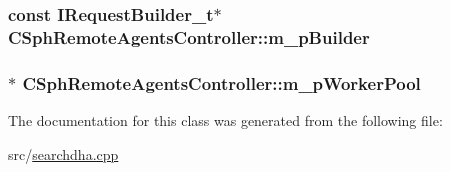 \hypertarget{classCSphRemoteAgentsController_a47d889a791191212a3a8d559aa69accf}{
\subsubsection[{m\-\_\-p\-Builder}]{\setlength{\rightskip}{0pt plus 5cm}const {\bf I\-Request\-Builder\-\_\-t}$\ast$ C\-Sph\-Remote\-Agents\-Controller\-::m\-\_\-p\-Builder\hspace{0.3cm}{\ttfamily [private]}}}\label{classCSphRemoteAgentsController_a47d889a791191212a3a8d559aa69accf}
\hypertarget{classCSphRemoteAgentsController_a1761bc177b4e266d5d4dfef5bcf77946}{
\subsubsection[{m\-\_\-p\-Worker\-Pool}]{$\ast$ C\-Sph\-Remote\-Agents\-Controller\-::m\-\_\-p\-Worker\-Pool\hspace{0.3cm}{\ttfamily [private]}}}\label{classCSphRemoteAgentsController_a1761bc177b4e266d5d4dfef5bcf77946}


The documentation for this class was generated from the following file\-:\begin{DoxyCompactItemize}
\item 
src/\hyperlink{searchdha_8cpp}{searchdha.\-cpp}\end{DoxyCompactItemize}
